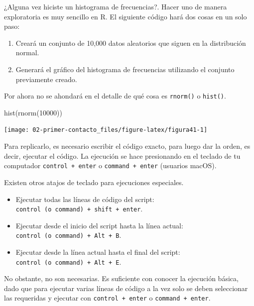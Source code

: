 \documentclass[
]{article}
\newenvironment{Shaded}{\begin{snugshade}}{\end{snugshade}}
\newcommand{\DecValTok}[1]{\textcolor[rgb]{0.00,0.00,0.81}{#1}}
\newcommand{\FunctionTok}[1]{\textcolor[rgb]{0.00,0.00,0.00}{#1}}
\newcommand{\NormalTok}[1]{#1}
\providecommand{\tightlist}{%
  \setlength{\itemsep}{0pt}\setlength{\parskip}{0pt}}
\theoremstyle{definition}
\theoremstyle{definition}
\theoremstyle{definition}
\theoremstyle{definition}
\theoremstyle{remark}
\begin{document}
¿Alguna vez hiciste un histograma de frecuencias?. Hacer uno de manera exploratoria es muy sencillo en R. El siguiente código hará dos cosas en un solo paso:

\begin{enumerate}
\def\labelenumi{\arabic{enumi}.}
\tightlist
\item
  Creará un conjunto de 10,000 datos aleatorios que siguen en la distribución normal.
\item
  Generará el gráfico del histograma de frecuencias utilizando el conjunto previamente creado.
\end{enumerate}

Por ahora no se ahondará en el detalle de qué cosa es \texttt{rnorm()} o \texttt{hist()}.

\begin{Shaded}
\begin{Highlighting}[]
\FunctionTok{hist}\NormalTok{(}\FunctionTok{rnorm}\NormalTok{(}\DecValTok{10000}\NormalTok{))}
\end{Highlighting}
\end{Shaded}

\begin{center}\texttt{[image: 02-primer-contacto\_files/figure-latex/figura41-1]} \end{center}

Para replicarlo, es necesario escribir el código exacto, para luego dar la orden, es decir, ejecutar el código. La ejecución se hace presionando en el teclado de tu computador \texttt{control\ +\ enter} o \texttt{command\ +\ enter} (usuarios macOS).

\begin{rmdnote}
Existen otros atajos de teclado para ejecuciones especiales.

\begin{itemize}
\tightlist
\item
  Ejecutar todas las líneas de código del script: \texttt{control\ (o\ command)\ +\ shift\ +\ enter}.
\item
  Ejecutar desde el inicio del script hasta la línea actual: \texttt{control\ (o\ command)\ +\ Alt\ +\ B}.
\item
  Ejecutar desde la línea actual hasta el final del script: \texttt{control\ (o\ command)\ +\ Alt\ +\ E}.
\end{itemize}

No obstante, no son necesarias. Es suficiente con conocer la ejecución básica, dado que para ejecutar varias líneas de código a la vez solo se deben seleccionar las requeridas y ejecutar con \texttt{control\ +\ enter} o \texttt{command\ +\ enter}.
\end{rmdnote}
\end{document}
